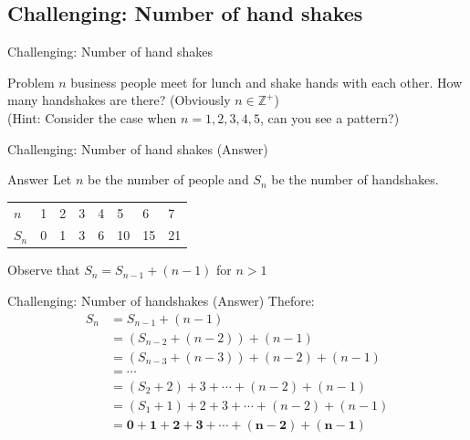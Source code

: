 \documentclass[10pt,xcolor={table,dvipsnames},t]{beamer}
\begin{document}
\subsection{Challenging: Number of hand shakes}
\begin{frame}{Challenging: Number of hand shakes}

  \begin{exampleblock}{Problem}
    $n$ business people meet for lunch and shake hands with each other. How many handshakes are there? (Obviously $n\in \mathbb{Z}^+$)\\
    (Hint: Consider the case when $n=1,2,3,4,5$, can you see a pattern?)
  \end{exampleblock}
\end{frame}

\begin{frame}{Challenging: Number of hand shakes (Answer)}

  \begin{alertblock}{Answer}
    Let $n$ be the number of people and $S_n$ be the number of handshakes.
    \begin{table}[]
      \begin{tabular}{llllllll}
      $n$ & 1 & 2 & 3 & 4 & 5 & 6 & 7\\
      $S_n$ & 0 & 1 & 3 & 6 & 10 & 15 & 21 
      \end{tabular}
      \end{table}
      Observe that $S_n = S_{n-1} + (n-1)$ for $n>1$
  \end{alertblock}
\end{frame}

\begin{frame}{Challenging: Number of handshakes (Answer)}
  Thefore:
  \begin{align*}
    S_n &= S_{n-1} + (n-1) \\
    &= (S_{n-2} + (n-2)) + (n-1)\\
    &= (S_{n-3} + (n-3)) + (n-2) + (n-1)\\
    &= \cdots\\
    &= (S_{2} + 2) + 3 + \cdots + (n-2) + (n-1)\\
    &= (S_{1} + 1) + 2 + 3 + \cdots + (n-2) + (n-1)\\
    &= \mathbf{0 + 1 + 2 + 3 + \cdots + (n-2) + (n-1)}
  \end{align*}
  
\end{frame}
\end{document}
